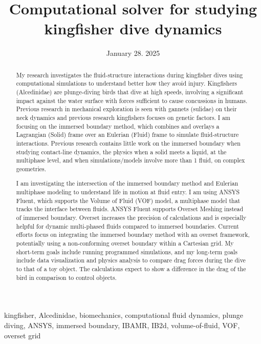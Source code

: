 \documentclass[12pt,conference,onecolumn]{IEEEtran}
\title{Computational solver for studying kingfisher dive dynamics }
\author{%
\IEEEauthorblockN{Pooja Thaker}\IEEEauthorblockA{Science \& Engineering\\Manalapan High School\\Englishtown, NJ\\425pthaker@frhsd.com}}
\date{January 28. 2025}
\newcommand{\keywords}{kingfisher, Alcedinidae, biomechanics, computational fluid dynamics, plunge diving, ANSYS, immersed boundary, IBAMR, IB2d, volume-of-fluid, VOF, overset grid}
\begin{document}
\maketitle 

\begin{abstract}
My research investigates the fluid-structure interactions during kingfisher dives using computational  simulations to understand better how they avoid injury. Kingfishers (Alcedinidae) are plunge-diving birds  that dive at high speeds, involving a significant impact against the water surface with forces sufficient  to cause concussions in humans. Previous research in mechanical exploration is seen with gannets (sulidae)  on their neck dynamics and previous research kingfishers focuses on genetic factors. I am focusing on the immersed boundary method, which combines and overlays a Lagrangian (Solid) frame over an Eulerian (Fluid)  frame to simulate fluid-structure interactions. Previous research contains little work on the immersed  boundary when studying contact-line dynamics, the physics when a solid meets a liquid, at the multiphase level, and when simulations/models involve more than 1 fluid, on complex geometries. 

I am investigating the intersection of the immersed boundary method and Eulerian multiphase modeling to understand life in motion at fluid entry. I am using ANSYS Fluent, which supports the Volume of Fluid (VOF)  model, a multiphase model that tracks the interface between fluids. ANSYS Fluent supports Overset Meshing  instead of immersed boundary. Overset increases the precision of calculations and is especially helpful  for dynamic multi-phased fluids compared to immersed boundaries. Current efforts focus on integrating the  immersed boundary method with an overset framework, potentially using a non-conforming overset boundary within a Cartesian grid. My short-term goals include running programmed simulations, and my long-term goals include data visualization and physics analysis to compare drag forces during the dive to that of a toy object. The calculations expect to show a difference in the drag of the bird in comparison to control objects.
\end{abstract}

\begin{IEEEkeywords}
\keywords
\end{IEEEkeywords}
\end{document}
